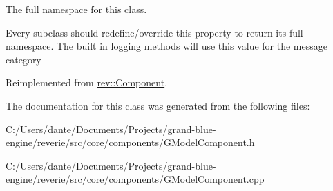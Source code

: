 The full namespace for this class. 

Every subclass should redefine/override this property to return its full namespace. The built in logging methods will use this value for the message category 

Reimplemented from \mbox{\hyperlink{classrev_1_1_component_ae2827b14c278588b95e01c4743fae674}{rev\+::\+Component}}.



The documentation for this class was generated from the following files\+:\begin{DoxyCompactItemize}
\item 
C\+:/\+Users/dante/\+Documents/\+Projects/grand-\/blue-\/engine/reverie/src/core/components/G\+Model\+Component.\+h\item 
C\+:/\+Users/dante/\+Documents/\+Projects/grand-\/blue-\/engine/reverie/src/core/components/G\+Model\+Component.\+cpp\end{DoxyCompactItemize}
